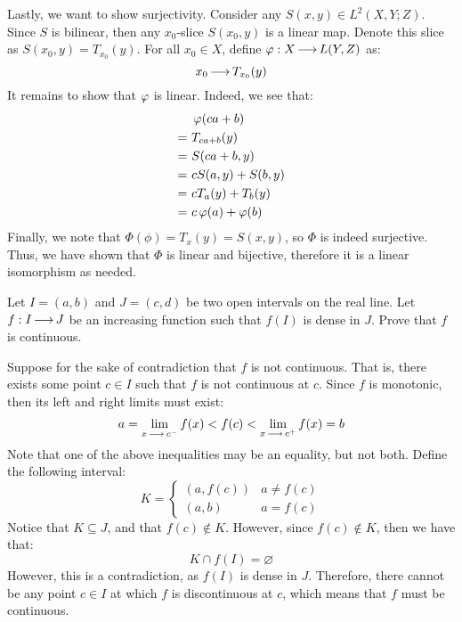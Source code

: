 \begin{soln}
    Lastly, we want to show surjectivity.
    Consider any $ S(x, y) \in L^{2}(X, Y; Z) $.
    Since $ S $ is bilinear, then any $ x_{0} $-slice $ S(x_{0}, y) $ is a linear
    map. Denote this slice as $ S(x_{0}, y) = T_{x_{0}}(y) $. 
    For all $ x_{0} \in X $, define $ \operatorname{\varphi} : X \operatorname{\longrightarrow} L(Y, Z) $ as:
    \begin{equation*}
        x_{0} \operatorname{\longrightarrow} T_{x_{0}}(y)
    \end{equation*}
    It remains to show that $ \operatorname{\varphi} $ is linear. Indeed, we see that:
    \begin{align*}
        & \operatorname{\varphi}(ca + b) \\
        = \ & T_{ca + b}(y) \\
        = \ & S(ca + b, y) \\
        = \ & cS(a, y) + S(b, y) \\
        = \ & cT_{a}(y) + T_{b}(y) \\
        = \ & c\operatorname{\varphi}(a) + \operatorname{\varphi}(b)
    \end{align*}
    Finally, we note that $ \Phi(\phi) = T_{x}(y) = S(x, y) $, so $ \Phi $ is
    indeed surjective. Thus, we have shown that $ \Phi $ is linear and bijective,
    therefore it is a linear isomorphism as needed.
\end{soln}


\newpage
\label{q3}
\begin{qu}[num=3]
    Let $ I = (a, b) $ and $ J = (c, d) $ be two open intervals on the real line.
    Let $ f: I \operatorname{\longrightarrow} J $ be an increasing function such that $ f(I) $ is
    dense in $ J $. Prove that $ f $ is continuous.
\end{qu}

\begin{soln}
    Suppose for the sake of contradiction that $ f $ is not continuous.
    That is, there exists some point $ c \in I $ such that $ f $ is not
    continuous at $ c $. \vsp
    Since $ f $ is monotonic, then its left and right limits must exist:
    \begin{equation*}
        a = \lim_{x \operatorname{\longrightarrow} c^{-}}f(x) < f(c) < \lim_{x \operatorname{\longrightarrow} c^{+}}
        f(x) = b
    \end{equation*}
    Note that one of the above inequalities may be an equality, but not both.
    \vsp
    Define the following interval:
    \begin{equation*}
        K = \begin{cases} (a, f(c)) & a \neq f(c) \\ (a, b) & a = f(c)
        \end{cases}
    \end{equation*}
    Notice that $ K \subseteq J $, and that $ f(c) \notin K $.
    However, since $ f(c) \notin K $, then we have that:
    \begin{equation*}
        K \cap f(I) = \varnothing
    \end{equation*}
    However, this is a contradiction, as $ f(I) $ is dense in $ J $.
    Therefore, there cannot be any point $ c \in I $ at which $ f $ is
    discontinuous at $ c $, which means that $ f $ must be continuous.
\end{soln}


